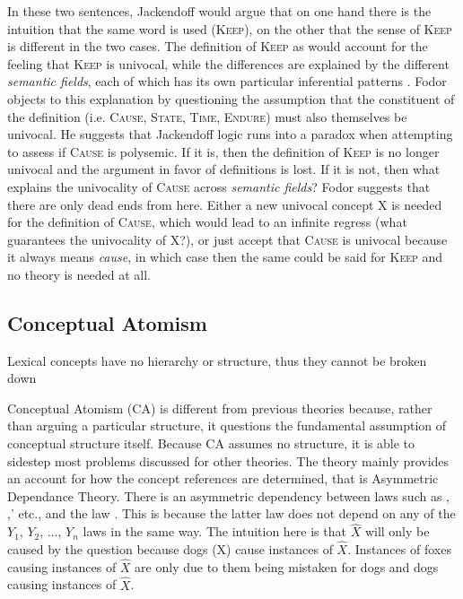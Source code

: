 In these two sentences, Jackendoff would argue that on one hand there is the intuition that the same word is used (\textsc{Keep}), on the other that the sense of \textsc{Keep} is different in the two cases. The definition of \textsc{Keep} as  would account for the feeling that \textsc{Keep} is univocal, 
while the differences are explained by the different \emph{semantic fields}, each of which has its own particular inferential patterns \citep{Jackendoff1995}. Fodor objects to this explanation by questioning the assumption that the constituent of the definition (i.e. \textsc{Cause, State, Time, Endure}) must also themselves be univocal. He suggests that Jackendoff logic runs into a paradox when attempting to assess if \textsc{Cause} is polysemic. If it is, then the definition of \textsc{Keep} is no longer univocal and the argument in favor of definitions is lost. If it is not, then what explains the univocality of \textsc{Cause} across \emph{semantic fields}? Fodor suggests that there are only dead ends from here. Either a new univocal concept X is needed for the definition of \textsc{Cause}, which would lead to an infinite regress (what guarantees the univocality of X?), or just accept that \textsc{Cause} is univocal because it always means \emph{cause}, in which case then the same could be said for \textsc{Keep} and no theory is needed at all.

\subsection{Conceptual Atomism}
\begin{mycolorbox}
	Lexical concepts have no hierarchy or structure, thus they cannot be broken down 
\end{mycolorbox}
Conceptual Atomism (CA) is different from previous theories because, rather than arguing a particular structure, it questions the fundamental assumption of conceptual structure itself. Because CA assumes no structure, it is able to sidestep most problems discussed for other theories. The theory mainly provides an account for how the concept references are determined, that is Asymmetric Dependance Theory. There is an asymmetric dependency between laws such as , ,' etc., and the law . This is because the latter law does not depend on any of the $Y_{1}$, $Y_{2}$, ..., $Y_{n}$ laws in the same way. The intuition here is that $\hat{X}$ will only be caused by the question  because dogs (X) cause instances of $\hat{X}$. Instances of foxes causing instances of $\hat{X}$ are only due to them being mistaken for dogs and dogs causing instances of $\hat{X}$.

